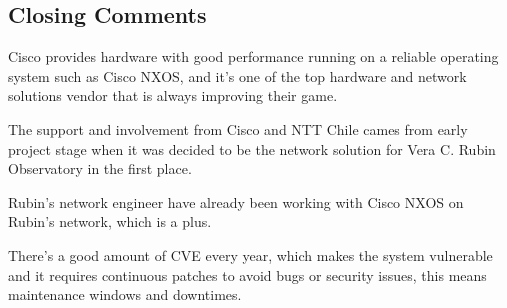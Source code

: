   \subsection{Closing Comments}
   
   Cisco provides hardware with good performance running on a reliable operating system such as Cisco NXOS, and it's one of the top hardware and network solutions vendor that is always improving their game. 
   
   The support and involvement from Cisco and NTT Chile cames from early project stage when it was decided to be the network solution for Vera C. Rubin Observatory in the first place. 
   
   Rubin's network engineer have already been working with Cisco NXOS on Rubin's network, which is a plus. 
   
   There's a good amount of CVE every year, which makes the system vulnerable and it requires continuous patches to avoid bugs or security issues, this means maintenance windows and downtimes.
   
   
  


